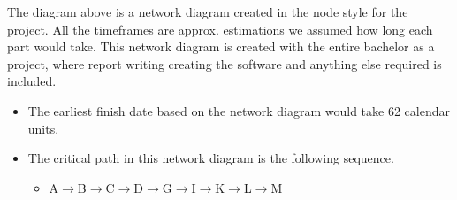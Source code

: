 The diagram above is a network diagram created in the node style for the project. All the timeframes are approx. estimations we assumed how long each part would take. This network diagram is created with the entire bachelor as a project, where report writing creating the software and anything else required is included.

\begin{itemize}
	\item The earliest finish date based on the network diagram would take 62 calendar units.
	\item The critical path in this network diagram is the following sequence.
	\begin{itemize}
		\item A$\rightarrow$B$\rightarrow$C$\rightarrow$D$\rightarrow$G$\rightarrow$I$\rightarrow$K$\rightarrow$L$\rightarrow$M
	\end{itemize}
\end{itemize}
